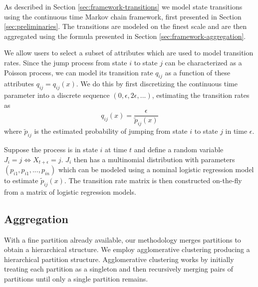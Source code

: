 As described in Section \ref{sec:framework-transitions} we model state transitions using the continuous
time Markov chain framework, first presented in Section \ref{sec:preliminaries}. The transitions are 
modeled on the finest scale and are then aggregated using the formula presented in Section \ref{sec:framework-aggregation}.

We allow users to select a subset of attributes which are used to model transition rates. Since the
jump process from state $i$ to state $j$ can be characterized as a Poisson process, we can model its
transition rate $q_{ij}$ as a function of these attributes $q_{ij} = q_{ij}(x)$. We do this by first
discretizing the continuous time parameter into a discrete sequence $(0, \epsilon, 2\epsilon, ...)$,
estimating the transition rates as
\begin{equation}
	q_{ij}(x) = \frac{\epsilon}{\tilde{p}_{ij}(x)}
\end{equation}
where $\tilde{p}_{ij}$ is the estimated probability of jumping from state $i$ to state $j$ in time
$\epsilon$.

Suppose the process is in state $i$ at time $t$ and define a random variable $J_i = j \Leftrightarrow X_{t + \epsilon} = j$.
$J_i$ then has a multinomial distribution with parameters $(p_{i1}, p_{i1}, ..., p_{in})$ which can be 
modeled using a nominal logistic regression model \cite{glm-introduction} to estimate $\tilde{p}_{ij}(x)$.
The transition rate matrix is then constructed on-the-fly from a matrix of logistic regression models.


\subsection{Aggregation}
\label{sec:state-aggregation-impl}

With a fine partition already available, our methodology merges partitions to obtain a hierarchical structure.
We employ agglomerative clustering \cite{Murtagh83} producing a hierarchical partition structure.
Agglomerative clustering works by initially treating each partition as a singleton and then recursively
merging pairs of partitions until only a single partition remains.

